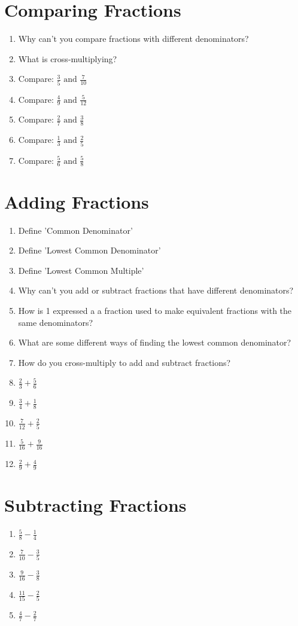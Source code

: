 \documentclass{article}
\begin{document}
\section*{Comparing Fractions}

\begin{enumerate}
    \item Why can't you compare fractions with different denominators?
    \item What is cross-multiplying?
    \item Compare: $\frac{3}{5} \text{ and } \frac{7}{10}$
    \item Compare: $\frac{4}{9} \text{ and } \frac{5}{12}$
    \item Compare: $\frac{2}{7} \text{ and } \frac{3}{8}$
    \item Compare: $\frac{1}{3} \text{ and } \frac{2}{5}$
    \item Compare: $\frac{5}{6} \text{ and } \frac{5}{8}$
\end{enumerate}

\section*{Adding Fractions}

\begin{enumerate}
    \item Define 'Common Denominator'
    \item Define 'Lowest Common Denominator'
    \item Define 'Lowest Common Multiple'
    \item Why can't you add or subtract fractions that have different denominators?
    \item How is 1 expressed a a fraction used to make equivalent fractions with the same denominators?
    \item What are some different ways of finding the lowest common denominator?
    \item How do you cross-multiply to add and subtract fractions?
    \item $\frac{2}{3} + \frac{5}{6}$
    \item $\frac{3}{4} + \frac{1}{8}$
    \item $\frac{7}{12} + \frac{2}{5}$
    \item $\frac{5}{16} + \frac{9}{16}$
    \item $\frac{2}{9} + \frac{4}{9}$
\end{enumerate}

\section*{Subtracting Fractions}

\begin{enumerate}
    \item $\frac{5}{8} - \frac{1}{4}$
    \item $\frac{7}{10} - \frac{3}{5}$
    \item $\frac{9}{16} - \frac{3}{8}$
    \item $\frac{11}{15} - \frac{2}{5}$
    \item $\frac{4}{7} - \frac{2}{7}$
\end{enumerate}
\end{document}
